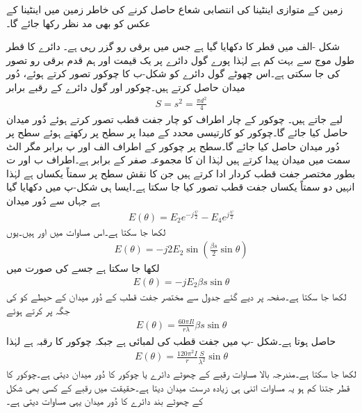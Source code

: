 زمین کے متوازی اینٹینا کی  انتصابی شعاع حاصل کرنے کی خاطر زمین میں اینٹینا کے عکس کو بھی مد نظر رکھا جائے گا۔

شکل -الف میں  قطر کا  دکھایا گیا ہے جس میں  برقی رو گزر رہی ہے۔ دائرے کا قطر طول موج سے بہت کم  ہے لہٰذا پورے گول دائرے پر یک قیمت اور ہم قدم برقی رو تصور کی جا سکتی ہے۔اس چھوٹے گول دائرے کو شکل-ب کا چوکور تصور کرتے ہوئے، دُور میدان حاصل کرتے ہیں۔چوکور اور گول دائرے کے رقبے  برابر
\begin{align}
S=s^2=\frac{\pi d^2}{4} 
\end{align}
لیے جاتے ہیں۔ چوکور کے چار اطراف کو چار جفت قطب تصور کرتے ہوئے دُور میدان حاصل کیا جائے گا۔چوکور کو کارتیسی محدد کے مبدا پر  سطح پر رکھتے ہوئے  سطح پر دُور میدان حاصل کیا جائے گا۔سطح  پر چوکور کے اطراف الف اور پ برابر مگر الٹ سمت میں میدان پیدا کرتے ہیں لہٰذا ان کا مجموعہ صفر کے برابر ہے۔اطراف ب اور ت بطور مختصر جفت قطب کردار ادا کرتے ہیں جن کا نقش  سطح پر سمتاً یکساں ہے لہٰذا انہیں دو سمتاً یکساں جفت قطب تصور کیا جا سکتا ہے۔ایسا ہی شکل-پ میں دکھایا گیا ہے جہاں سے دُور میدان
\begin{align*}
E(\theta)=E_2 e^{-j\frac{\psi}{2}}-E_4e^{j\frac{\psi}{2}}
\end{align*}
لکھا جا سکتا ہے۔اس مساوات میں  اور  ہیں۔یوں
\begin{align*}
E(\theta)=-j 2 E_2 \sin\left(\frac{\beta s}{2}\sin \theta \right) 
\end{align*}
لکھا جا سکتا ہے جسے  کی صورت میں
\begin{align}
E(\theta)=-j E_2 \beta s \sin \theta
\end{align}
لکھا جا سکتا ہے۔صفحہ  پر دیے گئے جدول  سے مختصر جفت قطب کے دُور میدان  کے حیطے کو  کی جگہ پر کرتے ہوئے
\begin{align}
E(\theta)=\frac{60 \pi I l}{r \lambda} \beta s \sin \theta
\end{align}
حاصل ہوتا ہے۔شکل -پ میں جفت قطب کی لمبائی  ہے جبکہ چوکور کا رقبہ  ہے لہٰذا
\begin{align}
E(\theta)=\frac{120 \pi^2 I}{r} \frac{S}{\lambda^2}\sin \theta
\end{align}
لکھا جا سکتا ہے۔مندرجہ بالا مساوات  رقبے کے چھوٹے دائرے یا چوکور کا دُور میدان دیتی ہے۔چوکور کا قطر جتنا کم ہو یہ مساوات اتنی ہی زیادہ درست میدان دیتا ہے۔حقیقت میں  رقبے کے کسی بھی شکل کے چھوٹے بند دائرے کا دُور میدان یہی مساوات دیتی ہے۔  

